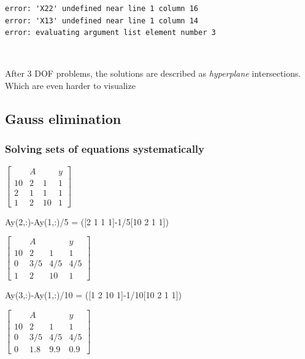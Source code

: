 \documentclass[11pt]{article}
\begin{document}
    \begin{Verbatim}[commandchars=\\\{\}]
error: 'X22' undefined near line 1 column 16
error: 'X13' undefined near line 1 column 14
error: evaluating argument list element number 3

    \end{Verbatim}

    \begin{center}
    \end{center}
    { \hspace*{\fill} \\}
    
    After 3 DOF problems, the solutions are described as \emph{hyperplane}
intersections. Which are even harder to visualize

    \subsection{Gauss elimination}\label{gauss-elimination}

\subsubsection{Solving sets of equations
systematically}\label{solving-sets-of-equations-systematically}

$\left[
\begin{array}{ccc|c}
   & A & & y \\
10 & 2 & 1 & 1\\
2 & 1 & 1  & 1 \\
1 & 2 & 10 & 1\end{array}
\right] $

Ay(2,:)-Ay(1,:)/5 = ({[}2 1 1 1{]}-1/5{[}10 2 1 1{]})

$\left[
\begin{array}{ccc|c}
   & A & & y \\
10 & 2 & 1 & 1\\
0 & 3/5 & 4/5  & 4/5 \\
1 & 2 & 10 & 1\end{array}
\right] $

Ay(3,:)-Ay(1,:)/10 = ({[}1 2 10 1{]}-1/10{[}10 2 1 1{]})

$\left[
\begin{array}{ccc|c}
   & A & & y \\
10 & 2 & 1 & 1\\
0 & 3/5 & 4/5  & 4/5 \\
0 & 1.8 & 9.9 & 0.9\end{array}
\right] $
\end{document}
